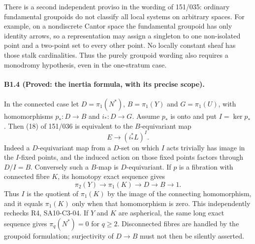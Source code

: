 There is a second independent proviso in the wording of 151/035:
ordinary fundamental groupoids do not classify all local systems on
arbitrary spaces. For example, on a nondiscrete Cantor space the
fundamental groupoid has only identity arrows, so a representation may
assign a singleton to one non-isolated point and a two-point set to
every other point. No locally constant sheaf has those stalk
cardinalities. Thus the purely groupoid wording also requires a
monodromy hypothesis, even in the one-stratum case.

\paragraph{B1.4 (Proved: the inertia formula, with its precise scope).}
In the connected case let $D=\pi_1(N^*)$, $B=\pi_1(Y)$ and
$G=\pi_1(U)$, with homomorphisms $p_*:D\to B$ and $i_*:D\to G$.
Assume $p_*$ is onto and put $I=\ker p_*$. Then (18) of 151/036 is
equivalent to the $B$-equivariant map
\[
 E\longrightarrow (i_*^*L)^I.
 \tag{B1.6}
\]
Indeed a $D$-equivariant map from a $D$-set on which $I$ acts trivially
has image in the $I$-fixed points, and the induced action on those fixed
points factors through $D/I=B$. Conversely such a $B$-map is
$D$-equivariant. If $p$ is a fibration with connected fibre $K$, its
homotopy exact sequence gives
\[
 \pi_2(Y)\longrightarrow\pi_1(K)\longrightarrow D
      \longrightarrow B\longrightarrow1.
 \tag{B1.7}
\]
Thus $I$ is the quotient of $\pi_1(K)$ by the image of the connecting
homomorphism, and it equals $\pi_1(K)$ only when that homomorphism is
zero. This independently rechecks R4, SA10-C3-04. If $Y$ and $K$ are
aspherical, the same long exact sequence gives $\pi_q(N^*)=0$ for
$q\geq2$. Disconnected fibres are handled by the groupoid formulation;
surjectivity of $D\to B$ must not then be silently asserted.


